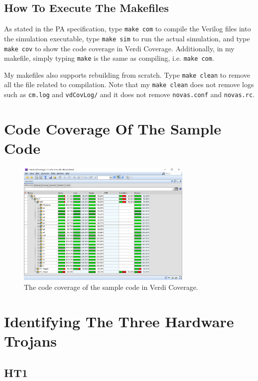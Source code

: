 \documentclass{article}
\begin{document}
\subsection{How To Execute The Makefiles \cite{gnumake}}

As stated in the PA specification, type \verb|make com| to compile the Verilog files into the simulation executable, type \verb|make sim| to run the actual simulation, and type \verb|make cov| to show the code coverage in Verdi Coverage. Additionally, in my makefile, simply typing \verb|make| is the same as compiling, i.e. \verb|make com|.

My makefiles also supports rebuilding from scratch. Type \verb|make clean| to remove all the file related to compilation. Note that my \verb|make clean| does not remove logs such as \verb|cm.log| and \verb|vdCovLog/| and it does not remove \verb|novas.conf| and \verb|novas.rc|.

\section{Code Coverage Of The Sample Code}

\begin{figure}[h] \centering
\includegraphics[width=0.75\textwidth]{HT}
\caption{The code coverage of the sample code in Verdi Coverage.}
\label{HT}
\end{figure}

\section{Identifying The Three Hardware Trojans}

\subsection{HT1}
\end{document}
